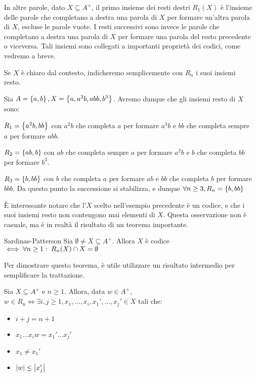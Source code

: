 In altre parole, dato \(X \subseteq A^+\), il primo insieme dei resti destri \(R_1(X)\) è l'insieme delle parole che completano a destra una parola di \(X\) per formare un'altra parola di \(X\), escluse le parole vuote.
I resti successivi sono invece le parole che completano a destra una parola di \(X\) per formare una parola del resto precedente o viceversa.
Tali insiemi sono collegati a importanti proprietà dei codici, come vedremo a breve.
\begin{note}{}
  Se \(X\) è chiaro dal contesto, indicheremo semplicemente con \(R_n\) i suoi insiemi resto.
\end{note}

\begin{example}{}
  Sia \(A = \set{a,b}, X = \set{a,a^3b,abb,b^3}\).
  Avremo dunque che gli insiemi resto di \(X\) sono:

  \(R_1 = \set{a^2b, bb}\)
  con \(a^2b\) che completa \(a\) per formare \(a^3b\) e \(bb\) che completa sempre \(a\) per formare \(abb\).

  \(R_2 = \set{ab,b}\)
  con \(ab\) che completa sempre \(a\) per formare \(a^2b\) e \(b\) che completa \(bb\) per formare \(b^3\).

  \(R_3 = \set{b,bb}\)
  con \(b\) che completa \(a\) per formare \(ab\) e \(bb\) che completa \(b\) per formare \(bbb\).
  Da questo punto la successione si stabilizza, e dunque \(\forall n \geq 3, R_n = \set{b,bb}\)
\end{example}

È interessante notare che l'\(X\) scelto nell'esempio precedente è un codice, e che i suoi insiemi resto non contengono mai elementi di \(X\).
Questa osservazione non è casuale, ma è in realtà il risultato di un teorema importante.
\begin{theorem}[label=thm:sardinas-patterson]{Sardinas-Patterson}
  Sia \(\emptyset \neq X \subseteq A^+\). Allora \(X\) è codice \(\iff \forall n\geq 1:\; R_n(X) \cap X = \emptyset\)
\end{theorem}

Per dimostrare questo teorema, è utile utilizzare un risultato intermedio per semplificare la trattazione.

\begin{lemma}[label=lem:sardinas-patterson-intermediate]{}
  Sia \(X \subseteq A^+\) e \(n\geq 1\). Allora, data \(w \in A^+\), \(w \in R_n \iff \exists i,j\geq 1, x_1,\ldots,x_i,x_1',\ldots,x_j' \in X\) tali che:
  \begin{itemize}
    \item \(i+j=n+1\)
    \item \(x_1\ldots x_{i}w = x_1'\ldots x_j'\)
    \item \(x_1 \neq x_1'\)
    \item \(\left|w\right| \leq \left|x_j'\right|\)
  \end{itemize}
\end{lemma}

